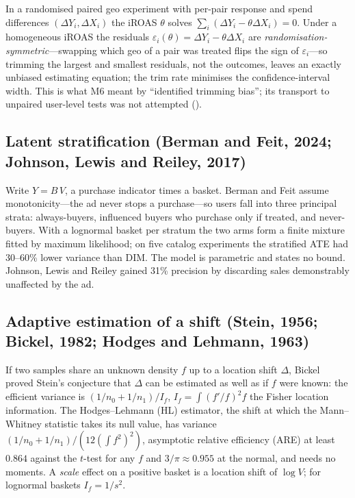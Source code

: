 In a randomised paired geo experiment with per-pair response and spend differences $(\Delta Y_i, \Delta X_i)$ the iROAS $\theta$ solves $\sum_i(\Delta Y_i - \theta\Delta X_i) = 0$. Under a homogeneous iROAS the residuals $\varepsilon_i(\theta) = \Delta Y_i - \theta\Delta X_i$ are \emph{randomisation-symmetric}---swapping which geo of a pair was treated flips the sign of $\varepsilon_i$---so trimming the largest and smallest residuals, not the outcomes, leaves an exactly unbiased estimating equation; the trim rate minimises the confidence-interval width. This is what M6 meant by ``identified trimming bias''; its transport to unpaired user-level tests was not attempted ().

\subsection{Latent stratification (Berman and Feit, 2024; Johnson, Lewis and Reiley, 2017)}

Write $Y = B\,V$, a purchase indicator times a basket. Berman and Feit assume monotonicity---the ad never stops a purchase---so users fall into three principal strata: always-buyers, influenced buyers who purchase only if treated, and never-buyers. With a lognormal basket per stratum the two arms form a finite mixture fitted by maximum likelihood; on five catalog experiments the stratified ATE had 30--60\% lower variance than DIM. The model is parametric and states no bound. Johnson, Lewis and Reiley gained 31\% precision by discarding sales demonstrably unaffected by the ad.

\subsection{Adaptive estimation of a shift (Stein, 1956; Bickel, 1982; Hodges and Lehmann, 1963)}

If two samples share an unknown density $f$ up to a location shift $\Delta$, Bickel proved Stein's conjecture that $\Delta$ can be estimated as well as if $f$ were known: the efficient variance is $(1/n_0 + 1/n_1)/I_f$, $I_f = \int (f'/f)^2 f$ the Fisher location information. The Hodges--Lehmann (HL) estimator, the shift at which the Mann--Whitney statistic takes its null value, has variance $(1/n_0 + 1/n_1)/(12(\int f^2)^2)$, asymptotic relative efficiency (ARE) at least $0.864$ against the $t$-test for any $f$ and $3/\pi \approx 0.955$ at the normal, and needs no moments. A \emph{scale} effect on a positive basket is a location shift of $\log V$; for lognormal baskets $I_f = 1/s^2$.

